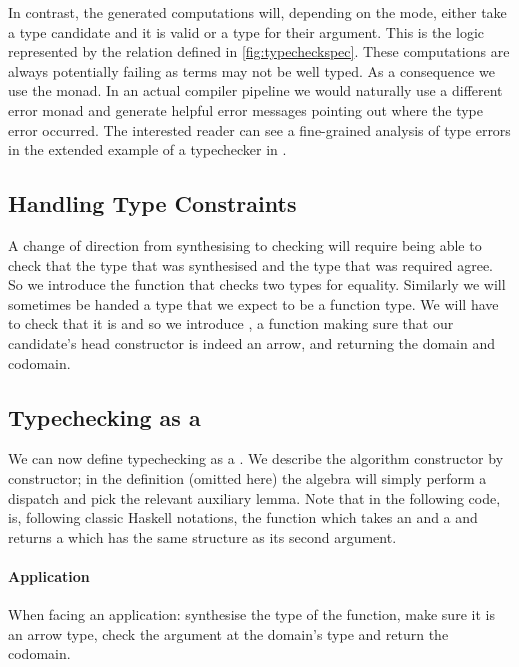 In contrast, the generated computations will, depending on the mode,
either take a type candidate and  it is valid or 
a type for their argument. This is the logic represented by the 
relation defined in \cref{fig:typecheckspec}.
%
These computations are always potentially failing as terms may not be
well typed. As a consequence we use the  monad. In an actual
compiler pipeline we would naturally use a different error monad and
generate helpful error messages pointing out where the type error occurred.
The interested reader can see a fine-grained analysis of type errors
in the extended example of a typechecker in
\citet{DBLP:journals/jfp/McBrideM04}.

\subsection{Handling Type Constraints}

A change of direction from synthesising to checking will require being
able to check that the type that was synthesised and the type that was
required agree. So we introduce the function  that checks
two types for equality.
%
Similarly we will sometimes be handed a type that we expect to be a
function type. We will have to check that it is and so we introduce
, a function making sure that our candidate's head
constructor is indeed an arrow, and returning the domain and codomain.



\subsection{Typechecking as a }

We can now define typechecking as a \semrec{}. We describe the
algorithm constructor by constructor; in the 
definition (omitted here) the algebra will simply perform a
dispatch and pick the relevant auxiliary lemma. Note that in the
following code, \AF{\_<\$\_} is, following classic Haskell notations,
the function which takes an  and a { } and
returns a { }
which has the same structure as its second argument.

\paragraph{Application} When facing an application: synthesise the type of the
function, make sure it is an arrow type, check the argument at the domain's
type and return the codomain.
\begin{agdasnippet}
\end{agdasnippet}
%
